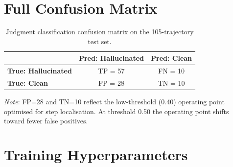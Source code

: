 \documentclass[11pt]{article}
\begin{document}
\section{Full Confusion Matrix}

\begin{table}[h]
\centering
\caption{Judgment classification confusion matrix on the 105-trajectory test set.}
\begin{tabular}{lcc}
\toprule
 & \textbf{Pred: Hallucinated} & \textbf{Pred: Clean} \\
\midrule
\textbf{True: Hallucinated} & TP = 57 & FN = 10 \\
\textbf{True: Clean}        & FP = 28 & TN = 10 \\
\bottomrule
\end{tabular}
\end{table}

\textit{Note}: FP=28 and TN=10 reflect the low-threshold (0.40) operating point optimised for step localisation. At threshold 0.50 the operating point shifts toward fewer false positives.

\section{Training Hyperparameters}
\end{document}
